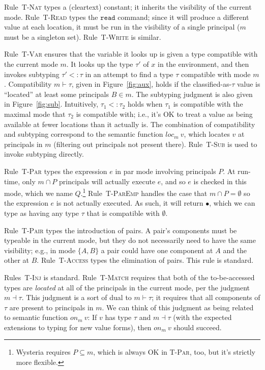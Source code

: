 \documentclass[10pt]{article}
\newcommand{\rulelab}[1]{{\small \textsc{#1}}}
\newcommand{\kw}[1]{\ensuremath{\mathtt{#1}}}
\newcommand{\vcrash}{\ensuremath{\bullet}}
\newcommand{\subtype}{\ensuremath{<:}}
\newcommand{\issub}[2]{{#1} \subtype {#2}}
\newcommand{\locof}[2]{\ensuremath{\mathit{loc}_{#1}~{#2}}}
\newcommand{\getat}[2]{\ensuremath{\mathit{on}_{#1}~{#2}}}
\begin{document}
Rule~\rulelab{T-Nat} types a (cleartext) constant; it inherits the
visibility of the current mode. Rule~\rulelab{T-Read} types the
\kw{read} command; since it will produce a different value at each
location, it must be run in the visibility of a single principal ($m$
must be a singleton set). Rule~\rulelab{T-Write} is
similar.

Rule~\rulelab{T-Var} ensures that the variable it looks up is given a
type compatible with the current mode $m$. It looks up the type
$\tau'$ of $x$ in the environment, and then invokes subtyping
$\issub{\tau'}{\tau}$ in an attempt to find a type $\tau$ compatible
with mode $m$. Compatibility $m \vdash \tau$, given in
Figure~\ref{fig:aux}, holds if the classified-as-$\tau$ value is
``located'' at least some principals $B \in m$. The subtyping judgment
is also given in Figure~\ref{fig:sub}. Intuitively,
$\issub{\tau_1}{\tau_2}$ holds when $\tau_1$ is compatible with the
maximal mode that $\tau_2$ is compatible with; i.e., it's OK to treat
a value as being available at fewer locations than it actually is. The
combination of compatibility and subtyping correspond to the semantic
function $\locof{m}{v}$, which locates $v$ at principals in $m$
(filtering out principals not present there). Rule~\rulelab{T-Sub} is
used to invoke subtyping directly.

Rule~\rulelab{T-Par} types the expression $e$ in par mode involving
principals $P$. At run-time, only $m \cap P$ principals will actually
execute $e$, and so $e$ is checked in this mode, which we name
$Q$.\footnote{Wysteria requires $P \subseteq m$, which is always OK in
  \rulelab{T-Par}, too, but it's strictly more flexible.}
Rule~\rulelab{T-ParEmp} handles the case that $m \cap P = \emptyset$
so the expression $e$ is not actually executed. As such, it will
return $\vcrash$, which we can type as having any type $\tau$ that is
compatible with $\emptyset$.

Rule~\rulelab{T-Pair} types the introduction of pairs. A pair's
components must be typeable in the current mode, but they do not
necessarily need to have the same visibility; e.g., in mode $\{A,B\}$
a pair could have one component at $A$ and the other at
$B$. Rule~\rulelab{T-Access} types the elimination of pairs. This rule
is standard.

Rules~\rulelab{T-Inj} is standard. Rule~\rulelab{T-Match} requires
that both of the to-be-accessed types are \emph{located} at all of the
principals in the current mode, per the judgment $m \dashv \tau$. This
judgment is a sort of dual to $m \vdash \tau$; it requires that all
components of $\tau$ are present to principals in $m$. We can think of
this judgment as being related to semantic function $\getat{m}{v}$: If $v$
has type $\tau$ and $m \dashv \tau$ (with the expected extensions to
typing for new value forms), then $\getat{m}{v}$ should succeed.
\end{document}
